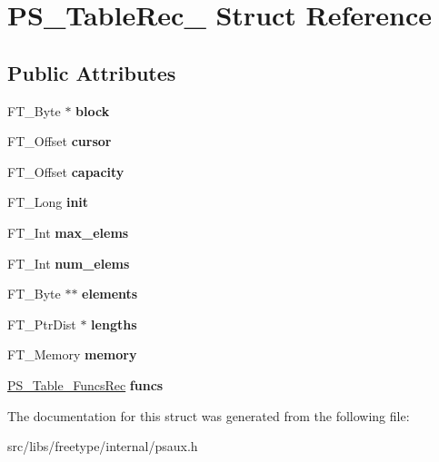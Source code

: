 \hypertarget{struct_p_s___table_rec__}{
\section{PS\_\-TableRec\_\- Struct Reference}
\label{struct_p_s___table_rec__}
}
\subsection*{Public Attributes}
\begin{DoxyCompactItemize}
\item 
\hypertarget{struct_p_s___table_rec___a6caa7b6aef2ba7e28d260b6a87782723}{
FT\_\-Byte $\ast$ {\bfseries block}}
\label{struct_p_s___table_rec___a6caa7b6aef2ba7e28d260b6a87782723}

\item 
\hypertarget{struct_p_s___table_rec___a8725d30f75b6dc785b988ed689ac7e58}{
FT\_\-Offset {\bfseries cursor}}
\label{struct_p_s___table_rec___a8725d30f75b6dc785b988ed689ac7e58}

\item 
\hypertarget{struct_p_s___table_rec___acf6d4f15ca247960cc7823b73d3c66bf}{
FT\_\-Offset {\bfseries capacity}}
\label{struct_p_s___table_rec___acf6d4f15ca247960cc7823b73d3c66bf}

\item 
\hypertarget{struct_p_s___table_rec___aa76fb2bcdcf4fc75e880b092bb9d3115}{
FT\_\-Long {\bfseries init}}
\label{struct_p_s___table_rec___aa76fb2bcdcf4fc75e880b092bb9d3115}

\item 
\hypertarget{struct_p_s___table_rec___a8594ec199ad792ed7ffd558806a7d23b}{
FT\_\-Int {\bfseries max\_\-elems}}
\label{struct_p_s___table_rec___a8594ec199ad792ed7ffd558806a7d23b}

\item 
\hypertarget{struct_p_s___table_rec___a26706016251497b19039f2c002c4e9d5}{
FT\_\-Int {\bfseries num\_\-elems}}
\label{struct_p_s___table_rec___a26706016251497b19039f2c002c4e9d5}

\item 
\hypertarget{struct_p_s___table_rec___a1967f81d98ea65a605968a7e1e5c51c3}{
FT\_\-Byte $\ast$$\ast$ {\bfseries elements}}
\label{struct_p_s___table_rec___a1967f81d98ea65a605968a7e1e5c51c3}

\item 
\hypertarget{struct_p_s___table_rec___a955ae6315b89923f1074f3d046da23b1}{
FT\_\-PtrDist $\ast$ {\bfseries lengths}}
\label{struct_p_s___table_rec___a955ae6315b89923f1074f3d046da23b1}

\item 
\hypertarget{struct_p_s___table_rec___a061872add9c6d1af67cfdfac5ce2b80d}{
FT\_\-Memory {\bfseries memory}}
\label{struct_p_s___table_rec___a061872add9c6d1af67cfdfac5ce2b80d}

\item 
\hypertarget{struct_p_s___table_rec___adced5ad36107c90012e9fafa55eab5b9}{
\hyperlink{struct_p_s___table___funcs_rec__}{PS\_\-Table\_\-FuncsRec} {\bfseries funcs}}
\label{struct_p_s___table_rec___adced5ad36107c90012e9fafa55eab5b9}

\end{DoxyCompactItemize}


The documentation for this struct was generated from the following file:\begin{DoxyCompactItemize}
\item 
src/libs/freetype/internal/psaux.h\end{DoxyCompactItemize}
